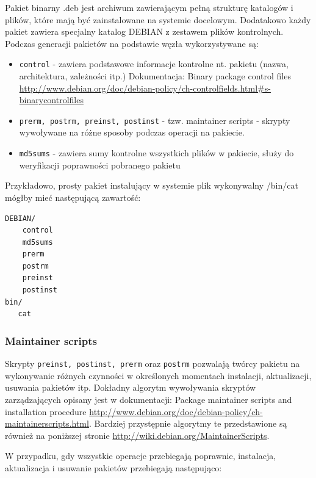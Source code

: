 \documentclass[polish,12pt]{aghthesis}
\begin{document}
Pakiet binarny .deb jest archiwum zawierającym pełną strukturę katalogów i plików, które mają być zainstalowane na systemie docelowym. Dodatakowo każdy pakiet zawiera specjalny katalog DEBIAN z zestawem plików kontrolnych. Podczas generacji pakietów na podstawie węzła wykorzystywane są:
\begin{itemize}
\item \texttt{control} - zawiera podstawowe informacje kontrolne nt. pakietu (nazwa, architektura, zależności itp.) Dokumentacja:  Binary package control files \url{http://www.debian.org/doc/debian-policy/ch-controlfields.html#s-binarycontrolfiles}
\item \texttt{prerm, postrm, preinst, postinst} - tzw. maintainer scripts - skrypty wywoływane na różne sposoby podczas operacji na pakiecie.
\item \texttt{md5sums} - zawiera sumy kontrolne wszystkich plików w pakiecie, służy do weryfikacji poprawności pobranego pakietu
\end{itemize}

Przykładowo, prosty pakiet instalujący w systemie plik wykonywalny /bin/cat mógłby mieć następującą zawartość:

\begin{verbatim}
DEBIAN/
    control
    md5sums
    prerm
    postrm
    preinst
    postinst
bin/
   cat
\end{verbatim}

\subsubsection{Maintainer scripts}
Skrypty \texttt{preinst, postinst, prerm} oraz \texttt{postrm} pozwalają twórcy pakietu na wykonywanie różnych czynności w określonych momentach instalacji, aktualizacji, usuwania pakietów itp. Dokładny algorytm wywoływania skryptów zarządzających opisany jest w dokumentacji: Package maintainer scripts and installation procedure \url{http://www.debian.org/doc/debian-policy/ch-maintainerscripts.html}. Bardziej przystępnie algorytmy te przedstawione są również na poniższej stronie \url{http://wiki.debian.org/MaintainerScripts}.

W przypadku, gdy wszystkie operacje przebiegają poprawnie, instalacja, aktualizacja i usuwanie pakietów przebiegają następująco:
\end{document}
